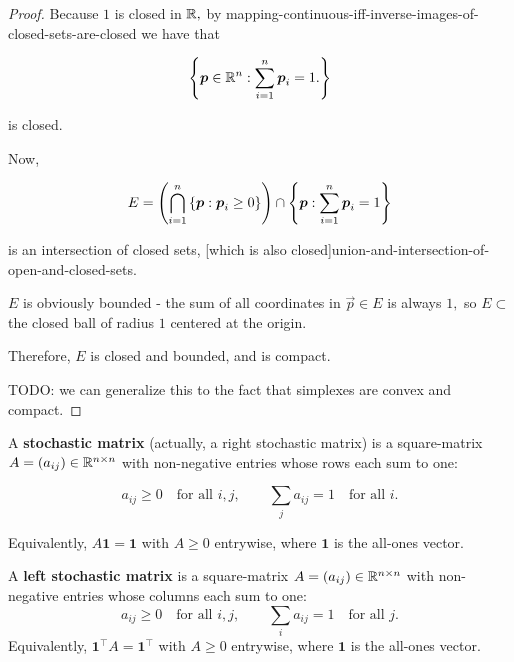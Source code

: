 \documentclass{article}
\begin{document}
\begin{theorem}
\begin{proof}
		Because ${1}$ is \@{closed} in $\mathbb{R},$ by \@{mapping-continuous-iff-inverse-images-of-closed-sets-are-closed} we have that

                \[ \left\{ \boldsymbol{p} \in \mathbb{R}^n : \sum_{i=1}^n \boldsymbol{p}_i = 1. \right\} \]

		is \@{closed.}

		Now,

		\[ E = \left(\bigcap_{i=1}^n \left\{ \boldsymbol{p} : \boldsymbol{p}_i \geq 0 \right\}\right) \cap \left\{ \boldsymbol{p} : \sum_{i=1}^n \boldsymbol{p}_i = 1 \right\} \]

		is an \@{intersection} of \@{closed} \@{sets}, \@[which is also closed]{union-and-intersection-of-open-and-closed-sets}.

		$E$ is obviously bounded - the sum of all coordinates in $\vec{p} \in E$ is always $1,$ so $E \subset$ the \@{closed} \@{ball} of radius $1$ centered at the origin.

		Therefore, $E$ is closed and bounded, and is compact.


                TODO: we can generalize this to the fact that \@{simplexes} are \@{convex} and \@{compact}.
	\end{proof}

\end{theorem}

\begin{definition}
A \textbf{stochastic matrix} (actually, a right stochastic matrix) is a \@{square-matrix} $A = (a_{ij}) \in \mathbb{R}^{n \times n}$ with \@{non-negative} \@{entries} whose rows each sum to one:

\[ a_{ij} \geq 0 \quad \text{for all } i,j, \qquad \sum_{j} a_{ij} = 1 \quad \text{for all } i. \]

Equivalently, $A\mathbf{1} = \mathbf{1}$ with $A \geq 0$ entrywise, where $\mathbf{1}$ is the all-ones \@{vector}.
\end{definition}

\begin{definition}
A \textbf{left stochastic matrix} is a \@{square-matrix} $A = (a_{ij}) \in \mathbb{R}^{n \times n}$ with \@{non-negative} \@{entries} whose columns each sum to one:
\[ a_{ij} \geq 0 \quad \text{for all } i,j, \qquad \sum_{i} a_{ij} = 1 \quad \text{for all } j. \]
Equivalently, $\mathbf{1}^\top A = \mathbf{1}^\top$ with $A \geq 0$ entrywise, where $\mathbf{1}$ is the all-ones \@{vector}.
\end{definition}
\end{document}
